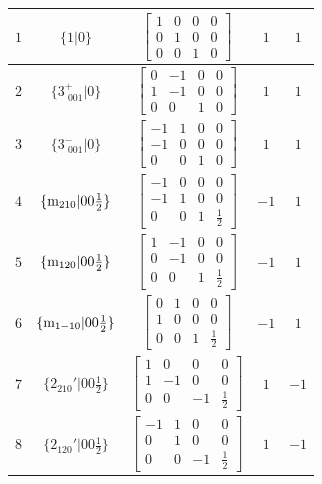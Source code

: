 \documentclass[fleqn,8pt]{jsarticle}
\begin{document}
\begin{longtable}{ccccc}
$ 1 $ & $ \{1|0\} $ & $ \begin{bmatrix} 1 & 0 & 0 & 0 \\ 0 & 1 & 0 & 0 \\ 0 & 0 & 1 & 0 \end{bmatrix} $ & $ 1 $ & $ 1 $ \\ \hline
$ 2 $ & $ \{3^{+}_{\,\,001}|0\} $ & $ \begin{bmatrix} 0 & -1 & 0 & 0 \\ 1 & -1 & 0 & 0 \\ 0 & 0 & 1 & 0 \end{bmatrix} $ & $ 1 $ & $ 1 $ \\ \hline
$ 3 $ & $ \{3^{-}_{\,\,001}|0\} $ & $ \begin{bmatrix} -1 & 1 & 0 & 0 \\ -1 & 0 & 0 & 0 \\ 0 & 0 & 1 & 0 \end{bmatrix} $ & $ 1 $ & $ 1 $ \\ \hline
$ 4 $ & $ \{{\rm m}_{210}|0 0 \frac{1}{2}\} $ & $ \begin{bmatrix} -1 & 0 & 0 & 0 \\ -1 & 1 & 0 & 0 \\ 0 & 0 & 1 & \frac{1}{2} \end{bmatrix} $ & $ -1 $ & $ 1 $ \\ \hline
$ 5 $ & $ \{{\rm m}_{120}|0 0 \frac{1}{2}\} $ & $ \begin{bmatrix} 1 & -1 & 0 & 0 \\ 0 & -1 & 0 & 0 \\ 0 & 0 & 1 & \frac{1}{2} \end{bmatrix} $ & $ -1 $ & $ 1 $ \\ \hline
$ 6 $ & $ \{{\rm m}_{1-10}|0 0 \frac{1}{2}\} $ & $ \begin{bmatrix} 0 & 1 & 0 & 0 \\ 1 & 0 & 0 & 0 \\ 0 & 0 & 1 & \frac{1}{2} \end{bmatrix} $ & $ -1 $ & $ 1 $ \\ \hline
$ 7 $ & $ \{2{}_{210}{}'|0 0 \frac{1}{2}\} $ & $ \begin{bmatrix} 1 & 0 & 0 & 0 \\ 1 & -1 & 0 & 0 \\ 0 & 0 & -1 & \frac{1}{2} \end{bmatrix} $ & $ 1 $ & $ -1 $ \\ \hline
$ 8 $ & $ \{2{}_{120}{}'|0 0 \frac{1}{2}\} $ & $ \begin{bmatrix} -1 & 1 & 0 & 0 \\ 0 & 1 & 0 & 0 \\ 0 & 0 & -1 & \frac{1}{2} \end{bmatrix} $ & $ 1 $ & $ -1 $ \\ \hline

\end{longtable}
\end{document}
